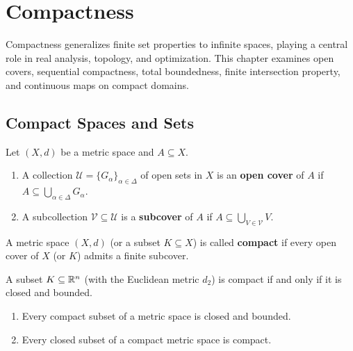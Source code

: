 \chapter{Compactness}
\label{chap:compactness}

Compactness generalizes finite set properties to infinite spaces, playing a central role in real analysis, topology, and optimization. This chapter examines open covers, sequential compactness, total boundedness, finite intersection property, and continuous maps on compact domains.

\section{Compact Spaces and Sets}
\label{sec:compact_def}

\begin{definition}
Let $(X,d)$ be a metric space and $A \subseteq X$.
\begin{enumerate}[label=\rm{(\roman*)}]
    \item A collection $\mathcal{U} = \{G_\alpha\}_{\alpha \in \Delta}$ of open sets in $X$ is an \textbf{open cover} of $A$ if $A \subseteq \bigcup_{\alpha \in \Delta} G_\alpha$.
    \item A subcollection $\mathcal{V} \subseteq \mathcal{U}$ is a \textbf{subcover} of $A$ if $A \subseteq \bigcup_{V \in \mathcal{V}} V$.
\end{enumerate}
\end{definition}

\begin{definition}
A metric space $(X,d)$ (or a subset $K \subseteq X$) is called \textbf{compact} if every open cover of $X$ (or $K$) admits a finite subcover.
\end{definition}

\begin{theorem}
A subset $K \subseteq \mathbb{R}^n$ (with the Euclidean metric $d_2$) is compact if and only if it is closed and bounded.
\end{theorem}

\begin{theorem}
\begin{enumerate}[label=\rm{(\roman*)}]
    \item Every compact subset of a metric space is closed and bounded.
    \item Every closed subset of a compact metric space is compact.
\end{enumerate}
\end{theorem}


